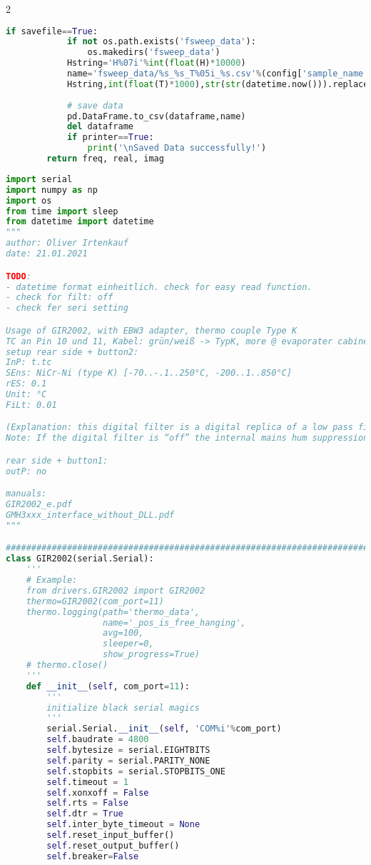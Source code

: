\begin{landscape}
\begin{multicols}{2}
\begin{lstlisting}[language=Python]
        if savefile==True:
            if not os.path.exists('fsweep_data'):
                os.makedirs('fsweep_data')
            Hstring='H%07i'%int(float(H)*10000)
            name='fsweep_data/%s_%s_T%05i_%s.csv'%(config['sample_name'],
            Hstring,int(float(T)*1000),str(str(datetime.now())).replace(':','-')[:-7])
            
            # save data
            pd.DataFrame.to_csv(dataframe,name)
            del dataframe
            if printer==True:
                print('\nSaved Data successfully!')
        return freq, real, imag
\end{lstlisting}

\begin{lstlisting}[language=Python]
import serial
import numpy as np
import os
from time import sleep
from datetime import datetime
"""
author: Oliver Irtenkauf
date: 21.01.2021

TODO:
- datetime format einheitlich. check for easy read function.
- check for filt: off
- check fer seri setting

Usage of GIR2002, with EBW3 adapter, thermo couple Type K
TC an Pin 10 und 11, Kabel: grün/weiß -> TypK, more @ evaporater cabinett
setup rear side + button2:
InP: t.tc
SEns: NiCr-Ni (type K) [-70..-.1..250°C, -200..1..850°C]
rES: 0.1
Unit: °C
FiLt: 0.01

(Explanation: this digital filter is a digital replica of a low pass filter.
Note: If the digital filter is “off” the internal mains hum suppression of the GIR2002 is deactivated. This adjustment is ideal for fastest response to even small changes of the signal, but the display and the analog output gets more turbulent. Therefore the filter should set to at least 0.01 for „ordi-nary‟ application A filter value of at least 0.1 is recommended for the input type S.)

rear side + button1:
outP: no

manuals:
GIR2002_e.pdf
GMH3xxx_interface_without_DLL.pdf
"""

##############################################################################
class GIR2002(serial.Serial):
    '''
    # Example:
    from drivers.GIR2002 import GIR2002
    thermo=GIR2002(com_port=11)
    thermo.logging(path='thermo_data',
                   name='_pos_is_free_hanging',
                   avg=100,
                   sleeper=0,
                   show_progress=True)
    # thermo.close()
    '''
    def __init__(self, com_port=11):
        '''
        initialize black serial magics
        '''
        serial.Serial.__init__(self, 'COM%i'%com_port)
        self.baudrate = 4800
        self.bytesize = serial.EIGHTBITS
        self.parity = serial.PARITY_NONE
        self.stopbits = serial.STOPBITS_ONE
        self.timeout = 1
        self.xonxoff = False
        self.rts = False
        self.dtr = True
        self.inter_byte_timeout = None
        self.reset_input_buffer()
        self.reset_output_buffer()
        self.breaker=False
        

\end{lstlisting}
\end{multicols}
\end{landscape}

